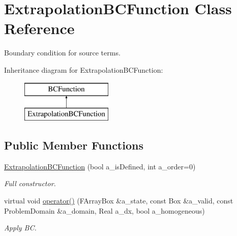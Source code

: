 \hypertarget{class_extrapolation_b_c_function}{\section{Extrapolation\-B\-C\-Function Class Reference}
\label{class_extrapolation_b_c_function}
}


Boundary condition for source terms.  


Inheritance diagram for Extrapolation\-B\-C\-Function\-:\begin{figure}[H]
\begin{center}
\leavevmode
\includegraphics[height=2.000000cm]{class_extrapolation_b_c_function}
\end{center}
\end{figure}
\subsection*{Public Member Functions}
\begin{DoxyCompactItemize}
\item 
\hypertarget{class_extrapolation_b_c_function_ab6747f91f0d3ee6d32634cae85f62dd8}{\hyperlink{class_extrapolation_b_c_function_ab6747f91f0d3ee6d32634cae85f62dd8}{Extrapolation\-B\-C\-Function} (bool a\-\_\-is\-Defined, int a\-\_\-order=0)}\label{class_extrapolation_b_c_function_ab6747f91f0d3ee6d32634cae85f62dd8}

\begin{DoxyCompactList}\small\item\em Full constructor. \end{DoxyCompactList}\item 
\hypertarget{class_extrapolation_b_c_function_a3d8d0ed4cda1a8beb61c5ac5817b36aa}{virtual void \hyperlink{class_extrapolation_b_c_function_a3d8d0ed4cda1a8beb61c5ac5817b36aa}{operator()} (F\-Array\-Box \&a\-\_\-state, const Box \&a\-\_\-valid, const Problem\-Domain \&a\-\_\-domain, Real a\-\_\-dx, bool a\-\_\-homogeneous)}\label{class_extrapolation_b_c_function_a3d8d0ed4cda1a8beb61c5ac5817b36aa}

\begin{DoxyCompactList}\small\item\em Apply B\-C. \end{DoxyCompactList}\end{DoxyCompactItemize}

